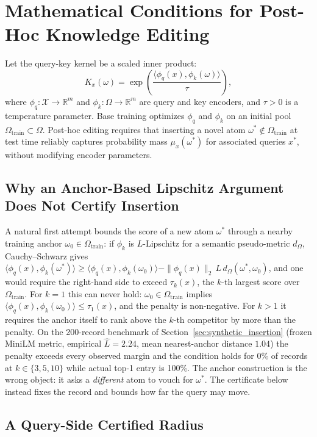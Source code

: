 \documentclass[preprint,12pt]{elsarticle}
\newcommand{\R}{\mathbb{R}}
\newcommand{\Om}{\Omega}
\begin{document}
\section{Mathematical Conditions for Post-Hoc Knowledge Editing}
\label{sec:editing}

Let the query-key kernel be a scaled inner product:
\[
  K_x(\omega) = \exp\left( \frac{\langle \phi_q(x), \phi_k(\omega) \rangle}{\tau} \right),
\]
where $\phi_q : \mathcal X \to \R^m$ and $\phi_k : \Om \to \R^m$ are query and key encoders, and $\tau > 0$ is a temperature parameter. Base training optimizes $\phi_q$ and $\phi_k$ on an initial pool $\Om_{\mathrm{train}} \subset \Om$. Post-hoc editing requires that inserting a novel atom $\omega^* \notin \Om_{\mathrm{train}}$ at test time reliably captures probability mass $\mu_x(\omega^*)$ for associated queries $x^*$, without modifying encoder parameters.

\subsection{Why an Anchor-Based Lipschitz Argument Does Not Certify Insertion}
\label{sec:anchor_remark}

A natural first attempt bounds the score of a new atom $\omega^*$ through a nearby training anchor $\omega_0\in\Om_{\mathrm{train}}$: if $\phi_k$ is $L$-Lipschitz for a semantic pseudo-metric $d_\Om$, Cauchy--Schwarz gives $\langle\phi_q(x),\phi_k(\omega^*)\rangle\ge\langle\phi_q(x),\phi_k(\omega_0)\rangle-\|\phi_q(x)\|_2\,L\,d_\Om(\omega^*,\omega_0)$, and one would require the right-hand side to exceed $\tau_k(x)$, the $k$-th largest score over $\Om_{\mathrm{train}}$. For $k=1$ this can never hold: $\omega_0\in\Om_{\mathrm{train}}$ implies $\langle\phi_q(x),\phi_k(\omega_0)\rangle\le\tau_1(x)$, and the penalty is non-negative. For $k>1$ it requires the anchor itself to rank above the $k$-th competitor by more than the penalty. On the 200-record benchmark of Section~\ref{sec:synthetic_insertion} (frozen MiniLM metric, empirical $\hat L=2.24$, mean nearest-anchor distance $1.04$) the penalty exceeds every observed margin and the condition holds for 0\% of records at $k\in\{3,5,10\}$ while actual top-1 entry is 100\%. The anchor construction is the wrong object: it asks a \emph{different} atom to vouch for $\omega^*$. The certificate below instead fixes the record and bounds how far the query may move.

\subsection{A Query-Side Certified Radius}
\end{document}
